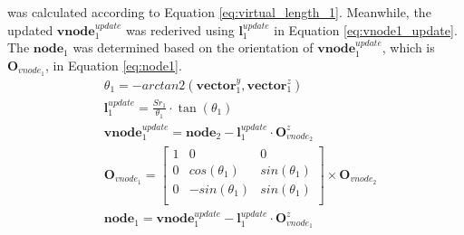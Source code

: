 \begin{itemize}
    was calculated according to Equation \ref{eq:virtual_length_1}. Meanwhile, the updated 
    $\textbf{vnode}_{1}^{update}$ was rederived using $\textbf{l}_{1}^{update}$ in Equation \ref{eq:vnode1_update}. 
    The $\textbf{node}_1$ was determined based on the orientation of $\textbf{vnode}_{1}^{update}$, 
    which is $\textbf{O}_{vnode_1}$, in Equation \ref{eq:node1}.
    \vspace{-5mm}
    \begin{align}
        &\theta_1 = -arctan2(\textbf{vector}_{1}^{y},\textbf{vector}_{1}^{z})
        \label{eq:theta_1} \\
        &\textbf{l}_{1}^{update} = \frac{Sr_1}{\theta_1}\cdot \tan(\theta_1)
        \label{eq:virtual_length_1} \\
        &\textbf{vnode}_{1}^{update} = \textbf{node}_{2} - \textbf{l}_{1}^{update} \cdot \textbf{O}_{vnode_2}^{z}
        \label{eq:vnode1_update} \\
        &\textbf{O}_{vnode_1} =     
        \begin{bmatrix}
            1 & 0 & 0 \\
            0 & cos(\theta_1) & sin(\theta_1) \\
            0 & -sin(\theta_1) & sin(\theta_1) \\
        \end{bmatrix}  
        \times \textbf{O}_{vnode_2}
        \label{eq:orientation_vnode1} \\
        &\textbf{node}_1 = \textbf{vnode}_{1}^{update} - \textbf{l}_{1}^{update} \cdot \textbf{O}_{vnode_1}^{z}
        \label{eq:node1} 
    \end{align}
    \vspace{-15mm}
\end{itemize}

